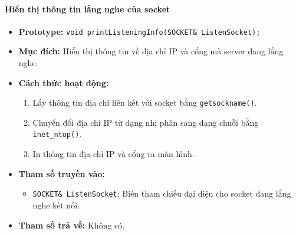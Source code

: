 \paragraph{\textbf{Hiển thị thông tin lắng nghe của socket}}
\begin{itemize}
    \item \textbf{Prototype:} \texttt{void printListeningInfo(SOCKET\& ListenSocket);}
    
    \item \textbf{Mục đích:} Hiển thị thông tin về địa chỉ IP và cổng mà server đang lắng nghe.
    
    \item \textbf{Cách thức hoạt động:} 
    \begin{enumerate}
        \item Lấy thông tin địa chỉ liên kết với socket bằng \texttt{getsockname()}.
        \item Chuyển đổi địa chỉ IP từ dạng nhị phân sang dạng chuỗi bằng \texttt{inet\_ntop()}.
        \item In thông tin địa chỉ IP và cổng ra màn hình.
    \end{enumerate}
    
    \item \textbf{Tham số truyền vào:} 
    \begin{itemize}
        \item \texttt{SOCKET\& ListenSocket}: Biến tham chiếu đại diện cho socket đang lắng nghe kết nối.
    \end{itemize}
    
    \item \textbf{Tham số trả về:} Không có.
\end{itemize}

